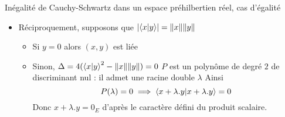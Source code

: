 \documentclass{article}
\renewenvironment{question_kholle}[2][ ]
{
	\subsection{\texorpdfstring{#2}{}}
	\notblank{#1}
	{
		\noindent #1
		\bigbreak
	}
	{}
	\begin{proof}
}
{
	\end{proof}
}
\begin{document}
\begin{question_kholle}{Inégalité de Cauchy-Schwartz dans un espace préhilbertien réel, cas d'égalité}
\begin{enumerate}
\begin{itemize}[label=$\star$]
			      \item Réciproquement, supposons que $\lvert  \braket{ x | y } \rvert = \| x\| \| y\|$
			            \begin{itemize}
				            \item Si $y = 0$ alors $(x, y)$ est liée
				            \item Sinon, $\Delta = 4(\braket{ x | y }^{2} - \|x\|\|y\|) = 0$
				                  $P$ est un polynôme de degré $2$ de discriminant nul : il admet une racine double $\lambda$
				                  Ainsi
				                  $$
					                  P(\lambda) = 0 \implies \braket{ x+\lambda.y | x+\lambda.y } = 0
				                  $$
				                  Donc $x+\lambda .y = 0_{E}$ d'après le caractère défini du produit scalaire.
			            \end{itemize}
		      \end{itemize}
	\end{enumerate}
\end{question_kholle}
\end{document}
